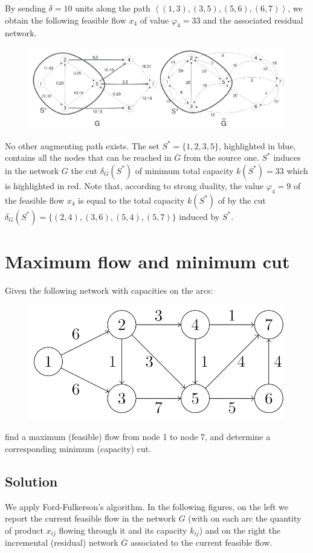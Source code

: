 \documentclass[12pt, a4paper]{report}
\begin{document}
        By sending $\delta = 10$ units along the path $\left\langle (1, 3),(3, 5),(5, 6),(6, 7)\right\rangle $, we obtain the following feasible flow $x_4$ of value $\varphi_4 = 33$ 
        and the associated residual network. 
        \begin{figure}[H]
            \centering
            \includegraphics[width=1\linewidth]{images/flow2.png}
        \end{figure}
        No other augmenting path exists. The set $S^{*} = \{1, 2, 3, 5\}$, highlighted in blue, contains all the nodes that can be reached in $\overline{G}$ from the 
        source one. $S^{*}$ induces in the network $G$ the cut $\delta_G(S^{*})$ of minimum total capacity $k(S^{*})=33$ which is highlighted in red. Note that, 
        according to strong duality, the value $\varphi_4 = 9$ of the feasible flow $x_4$ is equal to the total capacity $k(S^{*})$ of by the cut 
        $\delta_G(S^{*}) = \{(2, 4),(3, 6),(5, 4),(5, 7)\}$ induced by $S^{*}$.
        
    \newpage 

    \section{Maximum flow and minimum cut}
        Given the following network with capacities on the arcs: 
        \begin{figure}[H]
            \centering
            \includegraphics[width=0.5\linewidth]{images/maxcut.png}
        \end{figure}
        find a maximum (feasible) flow from node 1 to node 7, and determine a corresponding minimum (capacity) cut.
    \subsection*{Solution}
        We apply Ford-Fulkerson's algorithm. In the following figures, on the left we report the current feasible flow in the network $G$ (with on each arc the quantity 
        of product $x_{ij}$ flowing through it and its capacity $k_{ij}$) and on the right the incremental (residual) network $\overline{G}$ associated to the current 
        feasible flow.
\end{document}
